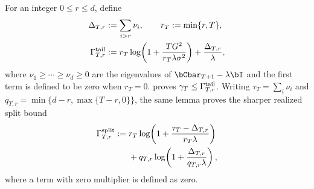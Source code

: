 For an integer $0\le r\le d$, define
\begin{equation}\label{eq:gamma-tail-main}
\begin{aligned}
 \Delta_{T,r}&:=\sum_{i>r}\nu_i,\qquad
 r_T:=\min\{r,T\},\\
 \Gamma^{\rm tail}_{T,r}
 &:=r_T\log\!\left(1+\frac{TG^2}
 {r_T\lambda\sigma^2}\right)+\frac{\Delta_{T,r}}{\lambda},
\end{aligned}
\end{equation}
where $\nu_1\ge\cdots\ge\nu_d\ge0$ are the eigenvalues of
$\bCbar_{T+1}-\lambda\bI$ and the first term is defined to be zero when
$r_T=0$.   proves
$\gamma_T\le\Gamma^{\rm tail}_{T,r}$.
Writing $\tau_T=\sum_i\nu_i$ and
$q_{T,r}=\min\{d-r,\max\{T-r,0\}\}$, the same lemma proves the sharper
realized split bound
\begin{equation}\label{eq:gamma-split-main}
\begin{aligned}
 \Gamma^{\rm split}_{T,r}:={}&
 r_T\log\!\left(1+\frac{\tau_T-\Delta_{T,r}}{r_T\lambda}\right)\\
 &+q_{T,r}\log\!\left(1+\frac{\Delta_{T,r}}{q_{T,r}\lambda}\right),
\end{aligned}
\end{equation}
where a term with zero multiplier is defined as zero.

